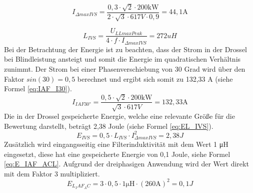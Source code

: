 		\begin{equation}
		\label{eq:DeltaIIVS}
		I_{\Delta max IVS}= \dfrac{0,3\cdot \sqrt{2} \cdot 200 \si{\kilo \watt}}{2 \cdot \sqrt{3} \cdot 617 \si{V} \cdot 0,9} = 44,1 \si{\A}
		\end{equation}
		
		\begin{equation}
			\label{eq:Livs}
			L_{IVS}= \dfrac{U_{LLmaxPeak}}{4\cdot f \cdot I_{\Delta max IVS}} = 272 uH
		\end{equation}
		Bei der Betrachtung der Energie ist zu beachten, dass der Strom in der Drossel bei Blindleistung ansteigt und somit die Energie im quadratischen Verhältnis zunimmt. Der Strom bei einer Phasenverschiebung von 30 Grad wird über den Faktor $sin(30)=0,5$ berechnet und ergibt sich somit zu 132,33 A (siehe Formel \ref{eq:IAF_I30}).
		\begin{equation}
			\label{eq:IAF_I30}
			I_{IAF30°}=\dfrac{0,5\cdot \sqrt{2} \cdot 200 \si{\kilo \watt}} { \sqrt{3} \cdot 617 \si{V}} = 132,33 \si{\A}
		\end{equation}
		Die in der Drossel gespeicherte Energie, welche eine relevante Größe für die Bewertung darstellt, beträgt 2,38 Joule (siehe Formel \ref{eq:EL_IVS}).
		\begin{equation}
			\label{eq:EL_IVS}
			E_{IVS}=0,5 \cdot L_{IVS} \cdot I_{\Delta max IVS}^{2} = 2,38 J
		\end{equation}
		Zusätzlich wird eingangsseitig eine Filterinduktivität mit dem Wert 1 \si{\micro \henry} eingesetzt, diese hat eine gespeicherte Energie von 0,1 Joule, siehe Formel \ref{eq:E_IAF_ACL}. Aufgrund der dreiphasigen Anwendung wird der Wert direkt mit dem Faktor 3 multipliziert.
			\begin{equation}
			\label{eq:E_IAF_ACL}
			E_{L_IAF_AC}=3\cdot 0,5 \cdot 1 \si{\micro \henry} \cdot (260 \si{\ampere})^{2} = 0,1 J
		\end{equation}
	
